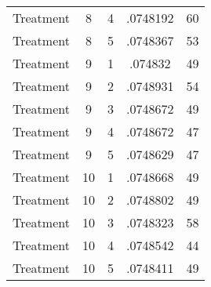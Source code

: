 \begin{tabular}{l*{4}{c}}
Treatment           &           8&           4&    .0748192&          60\\
Treatment           &           8&           5&    .0748367&          53\\
Treatment           &           9&           1&     .074832&          49\\
Treatment           &           9&           2&    .0748931&          54\\
Treatment           &           9&           3&    .0748672&          49\\
Treatment           &           9&           4&    .0748672&          47\\
Treatment           &           9&           5&    .0748629&          47\\
Treatment           &          10&           1&    .0748668&          49\\
Treatment           &          10&           2&    .0748802&          49\\
Treatment           &          10&           3&    .0748323&          58\\
Treatment           &          10&           4&    .0748542&          44\\
Treatment           &          10&           5&    .0748411&          49\\
\hline\hline
\end{tabular}
